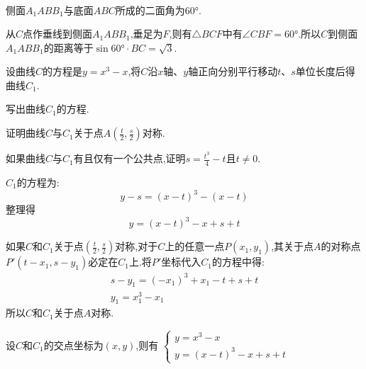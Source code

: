 \begin{questions}
\begin{solution}
\begin{penum}
\begin{align*}
			\end{align*}
			侧面$A_1ABB_1$与底面$ABC$所成的二面角为$\ang{60}$.
			\item
			从$C$点作垂线到侧面$A_1ABB_1$,垂足为$F$,则有$\triangle{BCF}$中有$\angle{CBF}=\ang{60}$.所以$C$到侧面$A_1ABB_1$的距离等于$\sin{\ang{60}} \cdot BC = \sqrt{3}$.
		\end{penum}
	\end{solution}
	\question 设曲线$C$的方程是$y=x^3-x$,将$C$沿$x$轴、$y$轴正向分别平行移动$t$、$s$单位长度后得曲线$C_1$.
	\begin{penum}
		\item 写出曲线$C_1$的方程.
		\item 证明曲线$C$与$C_1$关于点$A \left( \frac{t}{2},\frac{s}{2} \right)$对称.
		\item 如果曲线$C$与$C_1$有且仅有一个公共点,证明$s=\frac{t^3}{4}-t$且$t\neq0$.

		\begin{solution}
			\begin{penum}
				\item $C_1$的方程为:
				\begin{equation*}
					y - s = (x-t)^3 - (x-t)
				\end{equation*}
				整理得
				\begin{equation*}
					y = (x-t)^3 - x + s +t
				\end{equation*}
				\item
				如果$C$和$C_1$关于点$(\frac{t}{2},\frac{s}{2})$对称,对于$C$上的任意一点$P(x_1,y_1)$,其关于点$A$的对称点$P'(t-x_1,
					s-y_1)$必定在$C_1$上.将$P'$坐标代入$C_1$的方程中得:
				\begin{align*}
					s-y_1 = (-x_1)^3 +x_1 - t + s +t \\
					y_1 = x_1^3 - x_1
				\end{align*}
				所以$C$和$C_1$关于点$A$对称.
				\item 设$C$和$C_1$的交点坐标为$(x,y)$,则有
				\begin{math}
					\begin{cases}
						y = x^3 - x \\
						y = (x-t)^3 - x + s + t
					\end{cases}
				\end{math}


\end{penum}
\end{solution}
\end{penum}
\end{questions}
